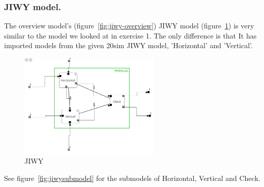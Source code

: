 \documentclass[a4paper,twoside,11pt]{article}
\begin{document}
\subsubsection{JIWY model.}
The overview model's (figure~\ref{fig:jiwy-overview}) JIWY model (figure~\ref{fig:jiwy-jiwy}) 
is very similar to the model we looked at in exercise 1. The only difference is that 
It has imported models from the given 20sim JIWY model, 'Horizontal' and 'Vertical'.
\begin{figure}[ht]
	\centering
		\includegraphics[width=0.6\textwidth]{./img/jiwy-jiwy.png}
		\caption{JIWY}
		\label{fig:jiwy-jiwy}
\end{figure}

See figure~\ref{fig:jiwysubmodel} for the submodels of Horizontal, Vertical and Check.
\end{document}
